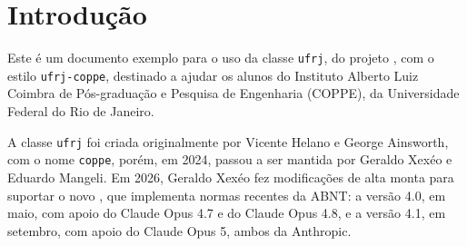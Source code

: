 \documentclass[dsc,setavermelha]{ufrj}
\theoremstyle{plain}
\theoremstyle{definition}
\theoremstyle{remark}
\begin{document}
  \listoffigures
  \listofframes
  \listofmapas
  \listofprograms
  \listofalgorithms
  \listoftables
  \printloabbreviations
  \printloacronyms
  \printlosymbols
  \tableofcontents

  \mainmatter
  \chapter{Introdução}

  Este é um documento exemplo para o uso da classe \verb|ufrj|, do projeto \CoppeTeX, com o estilo \verb|ufrj-coppe|, destinado a ajudar os alunos do Instituto Alberto Luiz Coimbra de Pós-graduação e Pesquisa de Engenharia (COPPE), da Universidade Federal do Rio de Janeiro.

  A classe \verb|ufrj| foi criada originalmente por Vicente Helano e George Ainsworth, com o nome \verb|coppe|, porém, em 2024, passou a ser mantida por Geraldo Xexéo e Eduardo Mangeli.
  Em 2026, Geraldo Xexéo fez modificações de alta monta para suportar o novo , que implementa normas recentes da ABNT: a versão 4.0, em maio, com apoio do Claude Opus 4.7 e do Claude Opus 4.8, e a versão 4.1, em setembro, com apoio do Claude Opus 5, ambos da Anthropic.
\end{document}
